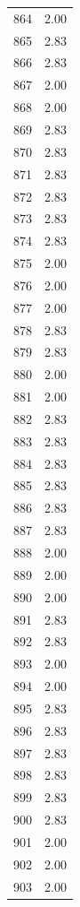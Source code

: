 \documentclass[a4paper,11pt]{article}
\begin{document}
\begin{center}
\begin{longtable}{|R{1.5cm}|R{2.5cm}|}
  864  &         2.00 \\ 
  865  &         2.83 \\ 
  866  &         2.83 \\ 
  867  &         2.00 \\ 
  868  &         2.00 \\ 
  869  &         2.83 \\ 
  870  &         2.83 \\ 
  871  &         2.83 \\ 
  872  &         2.83 \\ 
  873  &         2.83 \\ 
  874  &         2.83 \\ 
  875  &         2.00 \\ 
  876  &         2.00 \\ 
  877  &         2.00 \\ 
  878  &         2.83 \\ 
  879  &         2.83 \\ 
  880  &         2.00 \\ 
  881  &         2.00 \\ 
  882  &         2.83 \\ 
  883  &         2.83 \\ 
  884  &         2.83 \\ 
  885  &         2.83 \\ 
  886  &         2.83 \\ 
  887  &         2.83 \\ 
  888  &         2.00 \\ 
  889  &         2.00 \\ 
  890  &         2.00 \\ 
  891  &         2.83 \\ 
  892  &         2.83 \\ 
  893  &         2.00 \\ 
  894  &         2.00 \\ 
  895  &         2.83 \\ 
  896  &         2.83 \\ 
  897  &         2.83 \\ 
  898  &         2.83 \\ 
  899  &         2.83 \\ 
  900  &         2.83 \\ 
  901  &         2.00 \\ 
  902  &         2.00 \\ 
  903  &         2.00 \\ 

\end{longtable}
\end{center}
\end{document}
